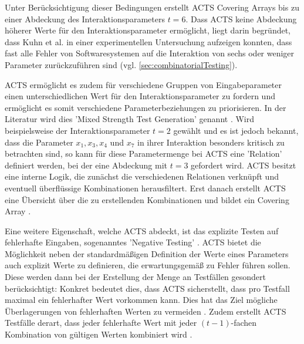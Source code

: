 Unter Berücksichtigung dieser Bedingungen erstellt ACTS Covering Arrays bis zu einer Abdeckung des Interaktionsparameters $t = 6$. Dass ACTS keine Abdeckung höherer Werte für den Interaktionsparameter ermöglicht, liegt darin begründet, dass Kuhn et al. \cite{kuhn2004error} in einer experimentellen Untersuchung aufzeigen konnten, dass fast alle Fehler von Softwaresystemen auf die Interaktion von sechs oder weniger Parameter zurückzuführen sind (vgl. \autoref{sec:combinatorialTesting}). 

ACTS ermöglicht es zudem für verschiedene Gruppen von Eingabeparameter einen unterschiedlichen Wert für den Interaktionsparameter zu fordern und ermöglicht es somit verschiedene Parameterbeziehungen zu priorisieren. In der Literatur wird dies 'Mixed Strength Test Generation' genannt \cite{yu2013acts, czerwonka2006pairwise}. Wird beispielsweise der Interaktionsparameter $t = 2$ gewählt und es ist jedoch bekannt, dass die Parameter $x_1, x_3, x_4$ und $x_7$ in ihrer Interaktion besonders kritisch zu betrachten sind, so kann für diese Parametermenge bei ACTS eine 'Relation' \cite{yu2013acts} definiert werden, bei der eine Abdeckung mit $t = 3$ gefordert wird. ACTS besitzt eine interne Logik, die zunächst die verschiedenen Relationen verknüpft und eventuell überflüssige Kombinationen herausfiltert. Erst danach erstellt ACTS eine Übersicht über die zu erstellenden Kombinationen und bildet ein Covering Array \cite{yu2013acts}.

Eine weitere Eigenschaft, welche ACTS abdeckt, ist das explizite Testen auf fehlerhafte Eingaben, sogenanntes 'Negative Testing' \cite{acts_user_guide}. ACTS bietet die Möglichkeit neben der standardmäßigen Definition der Werte eines Parameters auch explizit Werte zu definieren, die erwartungsgemäß zu Fehler führen sollen. Diese werden dann bei der Erstellung der Menge an Testfällen gesondert berücksichtigt: Konkret bedeutet dies, dass ACTS sicherstellt, dass pro Testfall maximal ein fehlerhafter Wert vorkommen kann. Dies hat das Ziel mögliche Überlagerungen von fehlerhaften Werten zu vermeiden \cite{acts_user_guide}. Zudem erstellt ACTS Testfälle derart, dass jeder fehlerhafte Wert mit jeder $(t-1)$-fachen Kombination von gültigen Werten kombiniert wird \cite{acts_user_guide}.
  
